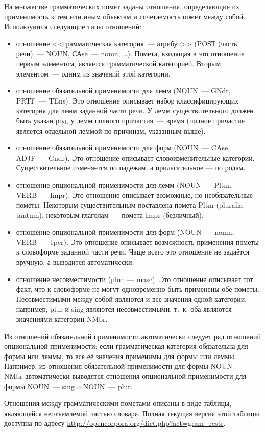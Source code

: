 \documentclass[a4paper]{article}
\begin{document}
На множестве грамматических помет заданы отношения, определяющие их применимость к тем или иным объектам и сочетаемость помет между собой. Используются следующие типы отношений:
\begin{itemize}
\item отношение <<грамматическая категория~--- атрибут>> (POSТ (часть речи)~--- NOUN, САse~--- nomn, \ldots). Помета, входящая в это отношение первым элементом, является грамматической категорией. Вторым элементом~--- одним из значений этой категории.
\item отношение обязательной применимости для лемм (NOUN~--- GNdr, PRTF~--- TEns). Это отношение описывает набор классифицирующих категория для лемм заданной части речи. У лемм существительного должен быть указан род, у лемм полного причастия~--- время (полное причастие является отдельной леммой по причинам, указанным выше).
\item отношение обязательной применимости для форм (NOUN~--- CAse, ADJF~--- Gndr). Это отношение описывает словоизменительные категории. Существительное изменяется по падежам, а прилагательное — по родам.
\item отношение опциональной применимости для лемм (NOUN~--- Pltm, VERB~--- Impr). Это отношение описывает возможные, но необязательные пометы. Некоторым существительным поставлена помета Pltm (pluralia tantum), некоторым глаголам~--- помета Impr (безличный).
\item отношение опциональной применимости для форм (NOUN~--- nomn, VERB~--- 1per). Это отношение описывает возможность применения пометы к словоформе заданной части речи. Чаще всего это отношение не задаётся вручную, а выводится автоматически.
\item отношение несовместимости (plur~--- masc). Это отношение описывает тот факт, что к словоформе не могут одновременно быть применены обе пометы. Несовместимыми между собой являются и все значения одной категории, например, plur и sing являются несовместимыми, т.~к. оба являются значениями категории NMbr.
\end{itemize}

Из отношений обязательной применимости автоматически следует ряд отношений опциональной применимости: если грамматическая категория обязательна для формы или леммы, то все её значения применимы для формы или леммы. Например, из отношения обязательной применимости для формы NOUN~--- NMbr автоматически выводятся отношения опциональной применимости для формы NOUN~--- sing и NOUN~--- plur.

Отношения между грамматическими пометами описаны в виде таблицы, являющейся неотъемлемой частью словаря. Полная текущая версия этой таблицы доступна по адресу \url{http://opencorpora.org/dict.php?act=gram_restr}.
\end{document}
